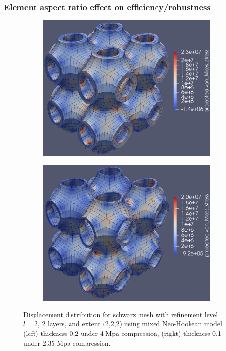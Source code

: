 \documentclass{beamer}
\begin{document}
\begin{frame}
	\frametitle{Element aspect ratio effect on efficiency/robustness}
	\begin{figure}[H]
		\begin{subfigure}{.5\textwidth}
			\centering
			\includegraphics[width=.8\textwidth]{../figs/von-mises-schwarz1.png}
		\end{subfigure}%
		\begin{subfigure}{.5\textwidth}
			\centering
			\includegraphics[width=.8\textwidth]{../figs/von-mises-schwarz2.png}
		\end{subfigure}
		\caption{Displacement distribution for schwarz mesh with refinement level $l=2$, 2 layers, and extent (2,2,2) using mixed Neo-Hookean model (left) thickness 0.2 under 4 Mpa compression, (right) thickness 0.1 under 2.35 Mpa compression.}
	\end{figure}
\end{frame}
\end{document}
